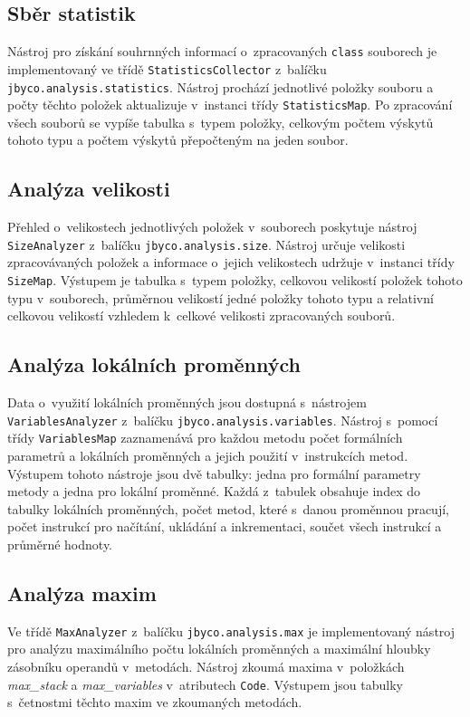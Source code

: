 \subsection{Sběr statistik}

Nástroj pro získání souhrnných informací o~zpracovaných \texttt{class} souborech je implementovaný ve třídě \texttt{StatisticsCollector} z~balíčku \texttt{jbyco.analysis.statistics}. Nástroj prochází jednotlivé položky souboru a  počty těchto položek aktualizuje v~instanci třídy \texttt{StatisticsMap}. Po zpracování všech souborů se vypíše tabulka s~typem položky, celkovým počtem výskytů tohoto typu a počtem výskytů přepočteným na jeden soubor. 

\subsection{Analýza velikosti}

Přehled o~velikostech jednotlivých položek v~souborech poskytuje nástroj \texttt{SizeAnalyzer} z~balíčku \texttt{jbyco.analysis.size}. Nástroj určuje velikosti zpracovávaných položek a informace o~jejich velikostech udržuje v~instanci třídy \texttt{SizeMap}. Výstupem je tabulka s~typem položky, celkovou velikostí položek tohoto typu v~souborech, průměrnou velikostí jedné položky tohoto typu a relativní celkovou velikostí vzhledem k~celkové velikosti zpracovaných souborů. 

\subsection{Analýza lokálních proměnných}

Data o~využití lokálních proměnných jsou dostupná s~nástrojem \texttt{VariablesAnalyzer} z~balíčku \texttt{jbyco.analysis.variables}. Nástroj s~pomocí třídy \texttt{VariablesMap} zaznamenává pro každou metodu počet formálních parametrů a lokálních proměnných a jejich použití v~instrukcích metod. Výstupem tohoto nástroje jsou dvě tabulky: jedna pro formální parametry metody a jedna pro lokální proměnné. Každá z~tabulek obsahuje index do tabulky lokálních proměnných, počet metod, které s~danou proměnnou pracují, počet instrukcí pro načítání, ukládání a inkrementaci, součet všech instrukcí a průměrné hodnoty.

\subsection{Analýza maxim}

Ve třídě \texttt{MaxAnalyzer} z~balíčku \texttt{jbyco.analysis.max} je implementovaný nástroj pro analýzu maximálního počtu lokálních proměnných a maximální hloubky zásobníku operandů v~metodách. Nástroj zkoumá maxima v~položkách \textit{max\_stack} a \textit{max\_variables} v~atributech \texttt{Code}. Výstupem jsou tabulky s~četnostmi těchto maxim ve zkoumaných metodách.

